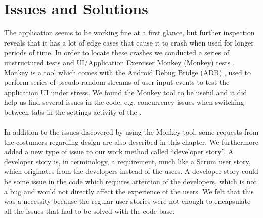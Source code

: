 
\chapter{Issues and Solutions}
\label{sec:sprintone_issues_solutions}
The \launcher application seems to be working fine at a first glance, but further inspection reveals that it has a lot of edge cases that cause it to crash when used for longer periods of time. In order to locate these crashes we conducted a series of unstructured tests and UI/Application Exerciser Monkey (Monkey) tests \parencite{android_monkey}. Monkey is a tool which comes with the Android Debug Bridge (ADB) \parencite{android_adb}, used to perform series of pseudo-random streams of user input events to test the application UI under stress. We found the Monkey tool to be useful and it did help us find several issues in the code, e.g. concurrency issues when switching between tabs in the settings activity of the \launcher.
\\\\
In addition to the issues discovered by using the Monkey tool, some requests from the costumers regarding design are also described in this chapter. We furthermore added a new type of issue to our work method called ``developer story''. A developer story is, in \giraf terminology, a requirement, much like a Scrum user story, which originates from the developers instead of the users. A developer story could be some issue in the code which requires attention of the developers, which is not a bug and would not directly affect the experience of the users. We felt that this was a necessity because the regular user stories were not enough to encapsulate all the issues that had to be solved with the code base. 






















